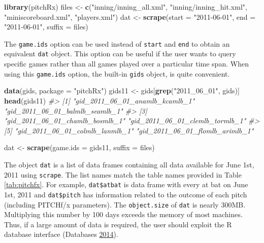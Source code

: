 \documentclass[12pt,]{isuthesis}
\newenvironment{Shaded}{\begin{snugshade}}{\end{snugshade}}
\newcommand{\KeywordTok}[1]{\textcolor[rgb]{0.13,0.29,0.53}{\textbf{{#1}}}}
\newcommand{\DataTypeTok}[1]{\textcolor[rgb]{0.13,0.29,0.53}{{#1}}}
\newcommand{\StringTok}[1]{\textcolor[rgb]{0.31,0.60,0.02}{{#1}}}
\newcommand{\CommentTok}[1]{\textcolor[rgb]{0.56,0.35,0.01}{\textit{{#1}}}}
\newcommand{\NormalTok}[1]{{#1}}
\begin{document}
\begin{Shaded}
\begin{Highlighting}[]
\KeywordTok{library}\NormalTok{(pitchRx)}
\NormalTok{files <-}\StringTok{ }\KeywordTok{c}\NormalTok{(}\StringTok{"inning/inning_all.xml"}\NormalTok{, }\StringTok{"inning/inning_hit.xml"}\NormalTok{, }
  \StringTok{"miniscoreboard.xml"}\NormalTok{, }\StringTok{"players.xml"}\NormalTok{)}
\NormalTok{dat <-}\StringTok{ }\KeywordTok{scrape}\NormalTok{(}\DataTypeTok{start =} \StringTok{"2011-06-01"}\NormalTok{, }\DataTypeTok{end =} \StringTok{"2011-06-01"}\NormalTok{, }\DataTypeTok{suffix =} \NormalTok{files)}
\end{Highlighting}
\end{Shaded}

The \texttt{game.ids} option can be used instead of \texttt{start} and
\texttt{end} to obtain an equivalent \texttt{dat} object. This option
can be useful if the user wants to query specific games rather than all
games played over a particular time span. When using this
\texttt{game.ids} option, the built-in \texttt{gids} object, is quite
convenient.

\begin{Shaded}
\begin{Highlighting}[]
\KeywordTok{data}\NormalTok{(gids, }\DataTypeTok{package =} \StringTok{"pitchRx"}\NormalTok{)}
\NormalTok{gids11 <-}\StringTok{ }\NormalTok{gids[}\KeywordTok{grep}\NormalTok{(}\StringTok{"2011_06_01"}\NormalTok{, gids)]}
\KeywordTok{head}\NormalTok{(gids11)}
\CommentTok{#> [1] "gid_2011_06_01_anamlb_kcamlb_1" "gid_2011_06_01_balmlb_seamlb_1"}
\CommentTok{#> [3] "gid_2011_06_01_chamlb_bosmlb_1" "gid_2011_06_01_clemlb_tormlb_1"}
\CommentTok{#> [5] "gid_2011_06_01_colmlb_lanmlb_1" "gid_2011_06_01_flomlb_arimlb_1"}
\end{Highlighting}
\end{Shaded}

\begin{Shaded}
\begin{Highlighting}[]
\NormalTok{dat <-}\StringTok{ }\KeywordTok{scrape}\NormalTok{(}\DataTypeTok{game.ids =} \NormalTok{gids11, }\DataTypeTok{suffix =} \NormalTok{files)}
\end{Highlighting}
\end{Shaded}

The object \texttt{dat} is a list of data frames containing all data
available for June 1st, 2011 using \texttt{scrape}. The list names match
the table names provided in Table \ref{tab:pitchfx}. For example,
\texttt{dat\$atbat} is data frame with every at bat on June 1st, 2011
and \texttt{dat\$pitch} has information related to the outcome of each
pitch (including PITCHf/x parameters). The \texttt{object.size} of
\texttt{dat} is nearly 300MB. Multiplying this number by 100 days
exceeds the memory of most machines. Thus, if a large amount of data is
required, the user should exploit the R database interface (Databases
\protect\hyperlink{ref-DBI}{2014}).
\end{document}
